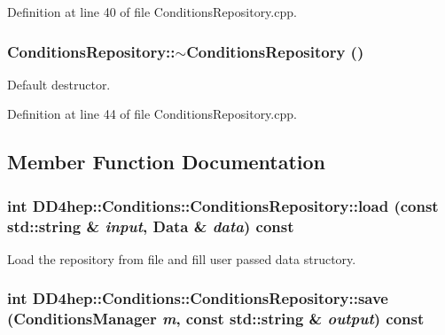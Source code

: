 Definition at line 40 of file ConditionsRepository.cpp.\hypertarget{class_d_d4hep_1_1_conditions_1_1_conditions_repository_a0c539a83a34e2a2fb3d0bab9586ec3e6}{
\subsubsection[{$\sim$ConditionsRepository}]{\setlength{\rightskip}{0pt plus 5cm}ConditionsRepository::$\sim$ConditionsRepository ()}}
\label{class_d_d4hep_1_1_conditions_1_1_conditions_repository_a0c539a83a34e2a2fb3d0bab9586ec3e6}


Default destructor. 

Definition at line 44 of file ConditionsRepository.cpp.

\subsection{Member Function Documentation}
\hypertarget{class_d_d4hep_1_1_conditions_1_1_conditions_repository_a66b77941fef3864614704a6b82b2d457}{
\subsubsection[{load}]{\setlength{\rightskip}{0pt plus 5cm}int DD4hep::Conditions::ConditionsRepository::load (const std::string \& {\em input}, \/  {\bf Data} \& {\em data}) const}}
\label{class_d_d4hep_1_1_conditions_1_1_conditions_repository_a66b77941fef3864614704a6b82b2d457}


Load the repository from file and fill user passed data structory. \hypertarget{class_d_d4hep_1_1_conditions_1_1_conditions_repository_aa51070661c9e9d9bbb17bc83924ffbec}{
\subsubsection[{save}]{\setlength{\rightskip}{0pt plus 5cm}int DD4hep::Conditions::ConditionsRepository::save ({\bf ConditionsManager} {\em m}, \/  const std::string \& {\em output}) const}}
\label{class_d_d4hep_1_1_conditions_1_1_conditions_repository_aa51070661c9e9d9bbb17bc83924ffbec}


